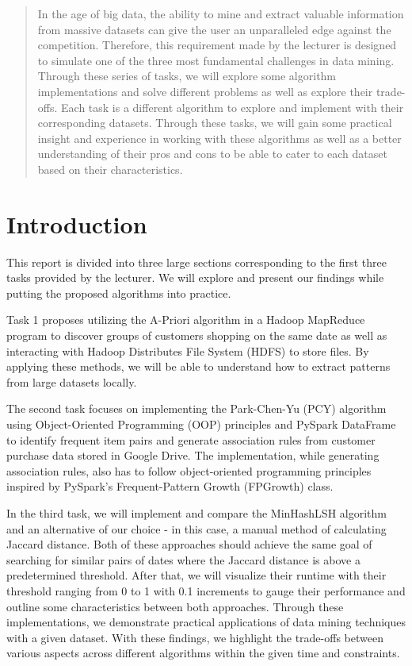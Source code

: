 \documentclass[conference]{IEEEtran}
\begin{document}
    \begin{abstract}
        In the age of big data, the ability to mine and extract valuable information from massive datasets can give the user an unparalleled edge against the competition.
        Therefore, this requirement made by the lecturer is designed to simulate one of the three most fundamental challenges in data mining.
        Through these series of tasks, we will explore some algorithm implementations and solve different problems as well as explore their trade-offs.
        Each task is a different algorithm to explore and implement with their corresponding datasets.
        Through these tasks, we will gain some practical insight and experience in working with these algorithms as well as a better understanding of their pros and cons to be able to cater to each dataset based on their characteristics.
    \end{abstract}

    \section{Introduction}
    \label{sec:introduction}

    This report is divided into three large sections corresponding to the first three tasks provided by the lecturer.
    We will explore and present our findings while putting the proposed algorithms into practice.

    Task 1 proposes utilizing the A-Priori algorithm in a Hadoop MapReduce program to discover groups of customers shopping on the same date as well as interacting with Hadoop Distributes File System (HDFS) to store files.
    By applying these methods, we will be able to understand how to extract patterns from large datasets locally.

    The second task focuses on implementing the Park-Chen-Yu (PCY) algorithm using Object-Oriented Programming (OOP) principles and PySpark DataFrame to identify frequent item pairs and generate association rules from customer purchase data stored in Google Drive.
    The implementation, while generating association rules, also has to follow object-oriented programming principles inspired by PySpark's Frequent-Pattern Growth (FPGrowth) class.

    In the third task, we will implement and compare the MinHashLSH algorithm and an alternative of our choice - in this case, a manual method of calculating Jaccard distance.
    Both of these approaches should achieve the same goal of searching for similar pairs of dates where the Jaccard distance is above a predetermined threshold.
    After that, we will visualize their runtime with their threshold ranging from 0 to 1 with 0.1 increments to gauge their performance and outline some characteristics between both approaches.
    Through these implementations, we demonstrate practical applications of data mining techniques with a given dataset.
    With these findings, we highlight the trade-offs between various aspects across different algorithms within the given time and constraints.
\end{document}
